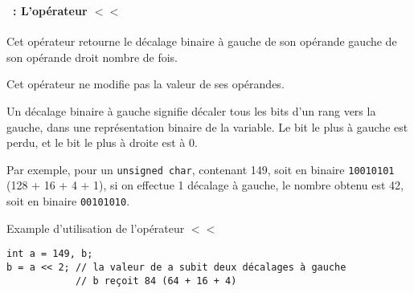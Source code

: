 \begin{frame}[containsverbatim]
  \frametitle{\secname}
  \framesubtitle{\subsecname~: L'opérateur $<<$} 

  Cet opérateur retourne le décalage binaire à gauche de son opérande gauche de son opérande droit nombre de fois. 
  \par
  Cet opérateur ne modifie pas la valeur de ses opérandes.
  \par
  Un décalage binaire à gauche signifie décaler tous les bits d'un rang vers la gauche, dans une représentation binaire de la variable. Le
  bit le plus à gauche est perdu, et le bit le plus à droite est à 0.
  \vspace{0.3cm}
  \par
  Par exemple, pour un \verb|unsigned char|, contenant 149, soit en binaire \texttt{10010101} (128 + 16 + 4 + 1), si on effectue 1 décalage
  à gauche, le nombre obtenu est 42, soit en binaire \texttt{00101010}.
  \vspace{0.3cm}
  \par
  \begin{exampleblock}{Example d'utilisation de l'opérateur $<<$}
    \begin{verbatim}
int a = 149, b;
b = a << 2; // la valeur de a subit deux décalages à gauche
            // b reçoit 84 (64 + 16 + 4)\end{verbatim}
  \end{exampleblock}
\end{frame}

